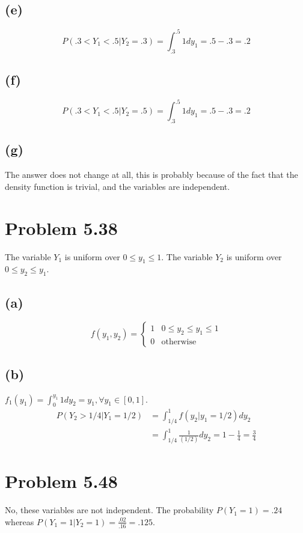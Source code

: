 \documentclass{article}
\theoremstyle{definition}
\begin{document}
    \subsection*{(e)}
        \[
            P(.3 < Y_1 < .5 | Y_2 = .3) = \int_{.3}^{.5} 1 dy_1 = .5 - .3 = .2
        \]

    \subsection*{(f)}
        \[
            P(.3 < Y_1 < .5 | Y_2 = .5) = \int_{.3}^{.5} 1 dy_1 = .5 - .3 = .2
        \]

    \subsection*{(g)}
        The answer does not change at all, this is probably because of the fact that the density 
        function is trivial, and the variables are independent.

\section*{Problem 5.38}
    The variable $Y_1$ is uniform over $0 \leqslant y_1 \leqslant 1$. The variable $Y_2$ is uniform 
    over $0 \leqslant y_2 \leqslant y_1$.

    \subsection*{(a)}
        \[
            f(y_1,y_2) = \begin{cases}
                1 & 0 \leqslant y_2 \leqslant y_1 \leqslant 1\\
                0 & \text{otherwise}
            \end{cases}
        \]

    \subsection*{(b)}
        $f_1(y_1) = \int_0^{y_1} 1 dy_2 = y_1, \forall y_1 \in [0,1]$.
        \begin{align*}
            P(Y_2 > 1/4 | Y_1 = 1/2) &= \int_{1/4}^1 f(y_2|y_1 = 1/2) dy_2\\
            &= \int_{1/4}^1 \frac{1}{(1 / 2)}dy_2 =1 - \frac{1}{4} = \frac{3}{4}
        \end{align*}

\section*{Problem 5.48}
    No, these variables are not independent. The probability $P(Y_1 = 1) = .24$ whereas $P(Y_1 = 1 | Y_2 = 1) = \frac{.02}{.16} = .125$.
\end{document}

